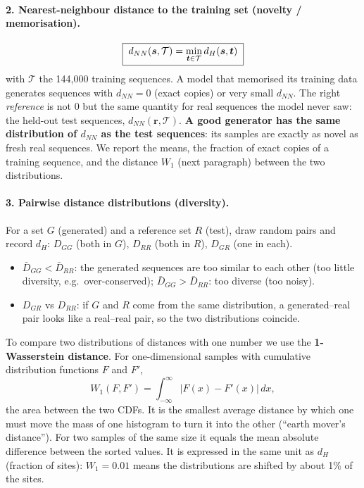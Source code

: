 \paragraph{2. Nearest-neighbour distance to the training set (novelty / memorisation).}
\begin{equation}\label{eq:dnn}
\boxed{\;d_{NN}(\bm{s},\mathcal T)=\min_{\bm t\in\mathcal T}d_H(\bm{s},\bm t)\;}
\end{equation}
with $\mathcal T$ the 144{,}000 training sequences. A model that memorised its training data generates
sequences with $d_{NN}=0$ (exact copies) or very small $d_{NN}$. The right \emph{reference} is not 0 but the same
quantity for real sequences the model never saw: the held-out test sequences, $d_{NN}(\bm r,\mathcal T)$.
\textbf{A good generator has the same distribution of $d_{NN}$ as the test sequences}: its samples are exactly
as novel as fresh real sequences. We report the means, the fraction of exact copies of a training sequence,
and the distance $W_1$ (next paragraph) between the two distributions.

\paragraph{3. Pairwise distance distributions (diversity).} For a set $G$ (generated) and a reference set $R$
(test), draw random pairs and record $d_H$: $D_{GG}$ (both in $G$), $D_{RR}$ (both in $R$), $D_{GR}$ (one in each).
\begin{itemize}[nosep]
\item $\bar D_{GG}<\bar D_{RR}$: the generated sequences are too similar to each other (too little diversity, e.g.\
      over-conserved); $\bar D_{GG}>\bar D_{RR}$: too diverse (too noisy).
\item $D_{GR}$ vs $D_{RR}$: if $G$ and $R$ come from the same distribution, a generated--real pair looks like a
      real--real pair, so the two distributions coincide.
\end{itemize}
To compare two distributions of distances with one number we use the \textbf{1-Wasserstein distance}. For
one-dimensional samples with cumulative distribution functions $F$ and $F'$,
\begin{equation}\label{eq:w1}
W_1(F,F')=\int_{-\infty}^{\infty}\big|F(x)-F'(x)\big|\,dx ,
\end{equation}
the area between the two CDFs. It is the smallest average distance by which one must move the mass of one
histogram to turn it into the other (``earth mover's distance''). For two samples of the same size it equals
the mean absolute difference between the sorted values. It is expressed in the same unit as $d_H$ (fraction of
sites): $W_1=0.01$ means the distributions are shifted by about 1\% of the sites.

